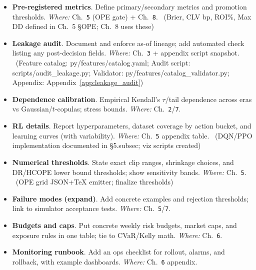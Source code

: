 \begin{itemize}
  \item {} \textbf{Pre-registered metrics}. Define primary/secondary metrics and promotion thresholds. \emph{Where:} Ch.~\texttt{5} (OPE gate) + Ch.~\texttt{8}. \done\ (Brier, CLV bp, ROI\%, Max DD defined in Ch.~5 \S OPE; Ch.~8 uses these)
  \item {} \textbf{Leakage audit}. Document and enforce as-of lineage; add automated check listing any post-decision fields. \emph{Where:} Ch.~\texttt{3} + appendix script snapshot. \done\ (Feature catalog: py/features/catalog.yaml; Audit script: scripts/audit\_leakage.py; Validator: py/features/catalog\_validator.py; Appendix: Appendix~\ref{app:leakage_audit})
\end{itemize}

\begin{itemize}
  \item {} \textbf{Dependence calibration}. Empirical Kendall’s $\tau$/tail dependence across eras vs Gaussian/$t$-copulas; stress bounds. \emph{Where:} Ch.~\texttt{2}/\texttt{7}.
  \item {} \textbf{RL details}. Report hyperparameters, dataset coverage by action bucket, and learning curves (with variability). \emph{Where:} Ch.~\texttt{5} appendix table. \done\ (DQN/PPO implementation documented in \S5.subsec; viz scripts created)
\end{itemize}

\begin{itemize}
  \item {} \textbf{Numerical thresholds}. State exact clip ranges, shrinkage choices, and DR/HCOPE lower bound thresholds; show sensitivity bands. \emph{Where:} Ch.~\texttt{5}. \done\ (OPE grid JSON+TeX emitter; finalize thresholds)
  \item {} \textbf{Failure modes (expand)}. Add concrete examples and rejection thresholds; link to simulator acceptance tests. \emph{Where:} Ch.~\texttt{5}/\texttt{7}.
\end{itemize}

\begin{itemize}
  \item {} \textbf{Budgets and caps}. Put concrete weekly risk budgets, market caps, and exposure rules in one table; tie to CVaR/Kelly math. \emph{Where:} Ch.~\texttt{6}.
  \item {} \textbf{Monitoring runbook}. Add an ops checklist for rollout, alarms, and rollback, with example dashboards. \emph{Where:} Ch.~\texttt{6} appendix.
\end{itemize}

